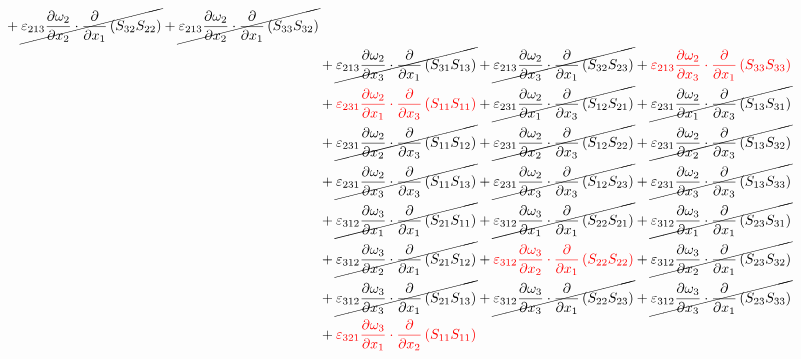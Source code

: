 \begin{equation}
\begin{split}
{}		+\cancel{\varepsilon_{213}\pdv{\omega_{2}}{x_{2}}\cdot\pdv{}{x_{1}}\left(S_{32}S_{22}\right)
}		+\cancel{\varepsilon_{213}\pdv{\omega_{2}}{x_{2}}\cdot\pdv{}{x_{1}}\left(S_{33}S_{32}\right)
}\\ 
		&+\cancel{\varepsilon_{213}\pdv{\omega_{2}}{x_{3}}\cdot\pdv{}{x_{1}}\left(S_{31}S_{13}\right)
}		+\cancel{\varepsilon_{213}\pdv{\omega_{2}}{x_{3}}\cdot\pdv{}{x_{1}}\left(S_{32}S_{23}\right)
}		+{\color{red}\varepsilon_{213}\pdv{\omega_{2}}{x_{3}}\cdot\pdv{}{x_{1}}\left(S_{33}S_{33}\right)
}\\ 
		&+{\color{red}\varepsilon_{231}\pdv{\omega_{2}}{x_{1}}\cdot\pdv{}{x_{3}}\left(S_{11}S_{11}\right)
}		+\cancel{\varepsilon_{231}\pdv{\omega_{2}}{x_{1}}\cdot\pdv{}{x_{3}}\left(S_{12}S_{21}\right)
}		+\cancel{\varepsilon_{231}\pdv{\omega_{2}}{x_{1}}\cdot\pdv{}{x_{3}}\left(S_{13}S_{31}\right)
}\\ 
		&+\cancel{\varepsilon_{231}\pdv{\omega_{2}}{x_{2}}\cdot\pdv{}{x_{3}}\left(S_{11}S_{12}\right)
}		+\cancel{\varepsilon_{231}\pdv{\omega_{2}}{x_{2}}\cdot\pdv{}{x_{3}}\left(S_{12}S_{22}\right)
}		+\cancel{\varepsilon_{231}\pdv{\omega_{2}}{x_{2}}\cdot\pdv{}{x_{3}}\left(S_{13}S_{32}\right)
}\\ 
		&+\cancel{\varepsilon_{231}\pdv{\omega_{2}}{x_{3}}\cdot\pdv{}{x_{3}}\left(S_{11}S_{13}\right)
}		+\cancel{\varepsilon_{231}\pdv{\omega_{2}}{x_{3}}\cdot\pdv{}{x_{3}}\left(S_{12}S_{23}\right)
}		+\cancel{\varepsilon_{231}\pdv{\omega_{2}}{x_{3}}\cdot\pdv{}{x_{3}}\left(S_{13}S_{33}\right)
}\\ 
		&+\cancel{\varepsilon_{312}\pdv{\omega_{3}}{x_{1}}\cdot\pdv{}{x_{1}}\left(S_{21}S_{11}\right)
}		+\cancel{\varepsilon_{312}\pdv{\omega_{3}}{x_{1}}\cdot\pdv{}{x_{1}}\left(S_{22}S_{21}\right)
}		+\cancel{\varepsilon_{312}\pdv{\omega_{3}}{x_{1}}\cdot\pdv{}{x_{1}}\left(S_{23}S_{31}\right)
}\\ 
		&+\cancel{\varepsilon_{312}\pdv{\omega_{3}}{x_{2}}\cdot\pdv{}{x_{1}}\left(S_{21}S_{12}\right)
}		+{\color{red}\varepsilon_{312}\pdv{\omega_{3}}{x_{2}}\cdot\pdv{}{x_{1}}\left(S_{22}S_{22}\right)
}		+\cancel{\varepsilon_{312}\pdv{\omega_{3}}{x_{2}}\cdot\pdv{}{x_{1}}\left(S_{23}S_{32}\right)
}\\ 
		&+\cancel{\varepsilon_{312}\pdv{\omega_{3}}{x_{3}}\cdot\pdv{}{x_{1}}\left(S_{21}S_{13}\right)
}		+\cancel{\varepsilon_{312}\pdv{\omega_{3}}{x_{3}}\cdot\pdv{}{x_{1}}\left(S_{22}S_{23}\right)
}		+\cancel{\varepsilon_{312}\pdv{\omega_{3}}{x_{3}}\cdot\pdv{}{x_{1}}\left(S_{23}S_{33}\right)
}\\ 
		&+{\color{red}\varepsilon_{321}\pdv{\omega_{3}}{x_{1}}\cdot\pdv{}{x_{2}}\left(S_{11}S_{11}\right)
}
\end{split}
\end{equation}
